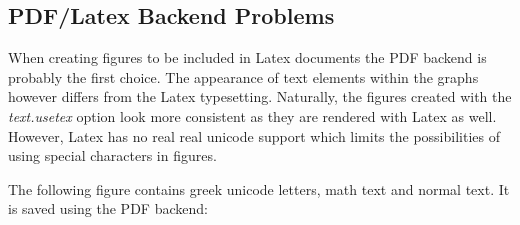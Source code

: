 \documentclass[12pt, a4paper]{article}
\begin{document}
\subsection*{PDF/Latex Backend Problems}

When creating figures to be included in Latex documents the PDF backend is probably the first choice. The appearance of text elements within the graphs however differs from the Latex typesetting. Naturally, the figures created with the \textit{text.usetex} option look more consistent as they are rendered with Latex as well. However, Latex has no real real unicode support which limits the possibilities of using special characters in figures.

The following figure contains greek unicode letters, math text and normal text. It is saved using the PDF backend:

\begin{figure}[h]
\hspace{1mm}
\end{figure}
\end{document}
